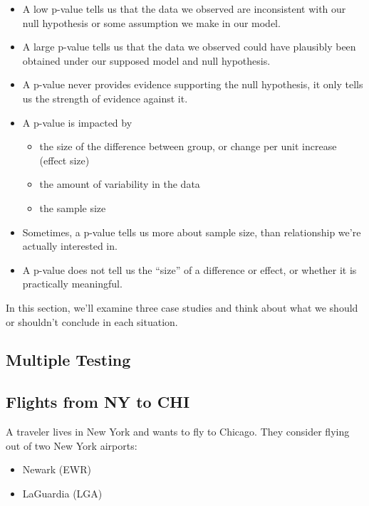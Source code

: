 \documentclass[
  letterpaper,
  DIV=11,
  numbers=noendperiod]{scrreprt}
\providecommand{\tightlist}{%
  \setlength{\itemsep}{0pt}\setlength{\parskip}{0pt}}\usepackage{longtable,booktabs,array}
\begin{document}
\begin{itemize}
\item
  A low p-value tells us that the data we observed are inconsistent with
  our null hypothesis or some assumption we make in our model.
\item
  A large p-value tells us that the data we observed could have
  plausibly been obtained under our supposed model and null hypothesis.
\item
  A p-value never provides evidence supporting the null hypothesis, it
  only tells us the strength of evidence against it.
\item
  A p-value is impacted by

  \begin{itemize}
  \tightlist
  \item
    the size of the difference between group, or change per unit
    increase (effect size)\\
  \item
    the amount of variability in the data\\
  \item
    the sample size
  \end{itemize}
\item
  Sometimes, a p-value tells us more about sample size, than
  relationship we're actually interested in.
\item
  A p-value does not tell us the ``size'' of a difference or effect, or
  whether it is practically meaningful.
\end{itemize}

In this section, we'll examine three case studies and think about what
we should or shouldn't conclude in each situation.

\subsection{Multiple Testing}\label{multiple-testing-1}

\subsection{Flights from NY to CHI}\label{flights-from-ny-to-chi}

A traveler lives in New York and wants to fly to Chicago. They consider
flying out of two New York airports:

\begin{itemize}
\tightlist
\item
  Newark (EWR)\\
\item
  LaGuardia (LGA)
\end{itemize}
\end{document}
